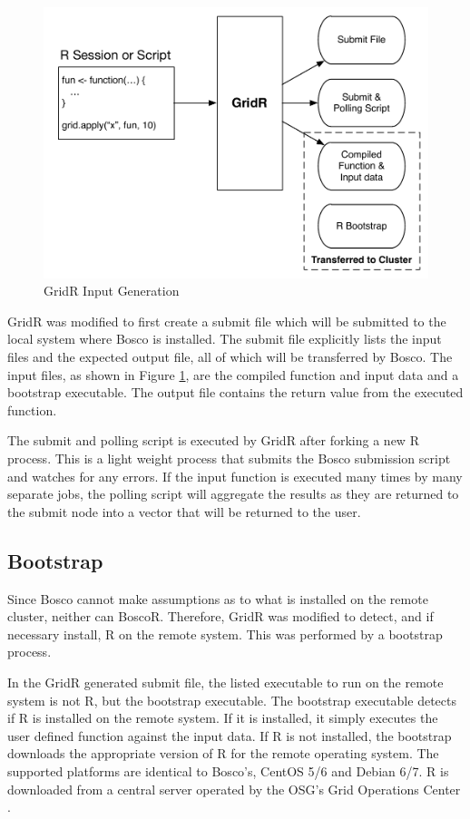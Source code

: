 \documentclass[conference]{IEEEtran}
\begin{document}
\begin{figure}[ht]
\centering
\includegraphics[width=.4\textwidth]{images/InputDiagram.pdf}
\caption{GridR Input Generation}
\label{fig:gridrinput}
\end{figure}

GridR was modified to first create a submit file which will be submitted to the local system where Bosco is installed.  The submit file explicitly lists the input files and the expected output file, all of which will be transferred by Bosco.  The input files, as shown in Figure \ref{fig:gridrinput}, are the compiled function and input data and a bootstrap executable.  The output file contains the return value from the executed function.

The submit and polling script is executed by GridR after forking a new R process.  This is a light weight process that submits the Bosco submission script and watches for any errors.  If the input function is executed many times by many separate jobs, the polling script will aggregate the results as they are returned to the submit node into a vector that will be returned to the user.  

\subsection{Bootstrap}
\label{sec:bootstrap}

Since Bosco cannot make assumptions as to what is installed on the remote cluster, neither can BoscoR.  Therefore, GridR was modified to detect, and if necessary install, R on the remote system.  This was performed by a bootstrap process.

In the GridR generated submit file, the listed executable to run on the remote system is not R, but the bootstrap executable.  The bootstrap executable detects if R is installed on the remote system.  If it is installed, it simply executes the user defined function against the input data.  If R is not installed, the bootstrap downloads the appropriate version of R for the remote operating system.  The supported platforms are identical to Bosco's, CentOS 5/6 and Debian 6/7.  R is downloaded from a central server operated by the OSG's Grid Operations Center \cite{osgoperations}.  
\end{document}
